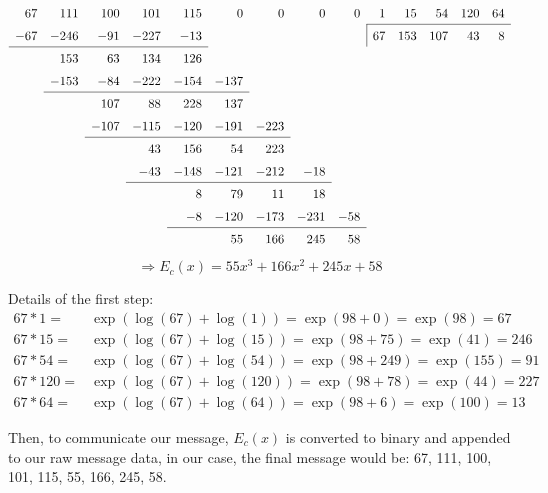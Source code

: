 \[
  \def\arraystretch{1.5}
  \begin{array}{rrrrrrrrrrrrrr}
     67 &  111 &  100 &  101 &  115 &    0 &    0 &    0 &   0 &\divline{1}&  15 &  54 & 120 & 64 \\
    \cline{10-14}
    -67 & -246 &  -91 & -227 &  -13 &      &      &      &     &        67 & 153 & 107 &  43 & 8 \\
    \cline{1-5}
        &  153 &   63 &  134 &  126 &      &      &      &     &           &     &     &     & \\
        & -153 &  -84 & -222 & -154 & -137 &      &      &     &           &     &     &     & \\
    \cline{2-6}
        &      &  107 &   88 &  228 &  137 &      &      &     &           &     &     &     & \\
        &      & -107 & -115 & -120 & -191 & -223 &      &     &           &     &     &     & \\
    \cline{3-7}
        &      &      &   43 &  156 &   54 &  223 &      &     &           &     &     &     & \\
        &      &      &  -43 & -148 & -121 & -212 &  -18 &     &           &     &     &     & \\
    \cline{4-8}
        &      &      &      &    8 &   79 &   11 &   18 &     &           &     &     &     & \\
        &      &      &      &   -8 & -120 & -173 & -231 & -58 &           &     &     &     & \\
    \cline{5-9}
        &      &      &      &      &   55 &  166 &  245 &  58 &           &     &     &     &
  \end{array}
  \def\arraystretch{1}
\]
\[
  \Rightarrow E_c(x) = 55x^3 + 166x^2 + 245x + 58
\]

Details of the first step:
\begin{align*}
  67 * 1 =& \exp(\log(67) + \log(1)) = \exp(98 + 0) = \exp(98) = 67\\
  67 * 15 =& \exp(\log(67) + \log(15)) = \exp(98 + 75) = \exp(41) = 246\\
  67 * 54 =& \exp(\log(67) + \log(54)) = \exp(98 + 249) = \exp(155) = 91\\
  67 * 120 =& \exp(\log(67) + \log(120)) = \exp(98 + 78) = \exp(44) = 227\\
  67 * 64 =& \exp(\log(67) + \log(64)) = \exp(98 + 6) = \exp(100) = 13
\end{align*}

Then, to communicate our message, $E_c(x)$ is converted to binary and appended to our raw message data, in our case, the final message would be: 67, 111, 100, 101, 115, 55, 166, 245, 58.

